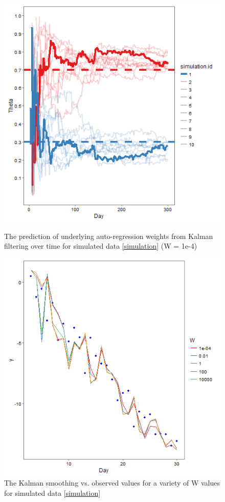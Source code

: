 \documentclass{sig-alternate-05-2015}
\begin{document}
\begin{figure}[ht]

	\includegraphics[width=0.7\linewidth]{Test_Weight_Estimation.png}
	\centering
	\caption{The prediction of underlying auto-regression weights from Kalman filtering over time for simulated data \eqref{simulation} (W = 1e-4)}
			\label{fig:Weight_Estimation}
			
	\includegraphics[width=0.7\linewidth]{W_variation.png}
	\centering
	\caption{The Kalman smoothing vs. observed values for a variety of W values for simulated data \eqref{simulation}}
			\label{fig:W_variation}
			

\end{figure}
\end{document}

